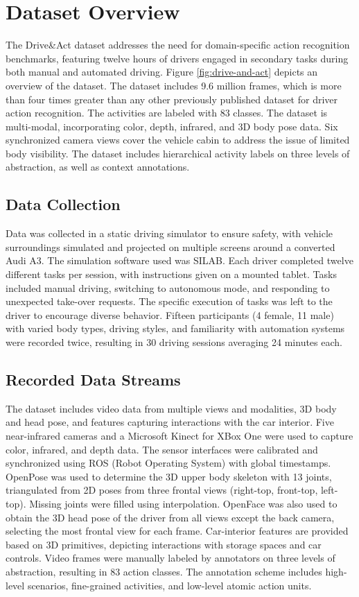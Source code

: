 \documentclass{article}
\begin{document}
\section{Dataset Overview}

The Drive\&Act dataset \cite{drive_and_act_2019_iccv} addresses the need for domain-specific action recognition benchmarks, featuring twelve hours of drivers engaged in secondary tasks during both manual and automated driving. Figure \ref{fig:drive-and-act} depicts an overview of the dataset. The dataset includes 9.6 million frames, which is more than four times greater than any other previously published dataset for driver action recognition. The activities are labeled with 83 classes. The dataset is multi-modal, incorporating color, depth, infrared, and 3D body pose data. Six synchronized camera views cover the vehicle cabin to address the issue of limited body visibility. The dataset includes hierarchical activity labels on three levels of abstraction, as well as context annotations.
\subsection{Data Collection}
Data was collected in a static driving simulator to ensure safety, with vehicle surroundings simulated and projected on multiple screens around a converted Audi A3. The simulation software used was SILAB.
Each driver completed twelve different tasks per session, with instructions given on a mounted tablet. Tasks included manual driving, switching to autonomous mode, and responding to unexpected take-over requests. The specific execution of tasks was left to the driver to encourage diverse behavior.
Fifteen participants (4 female, 11 male) with varied body types, driving styles, and familiarity with automation systems were recorded twice, resulting in 30 driving sessions averaging 24 minutes each.
\subsection{Recorded Data Streams}
The dataset includes video data from multiple views and modalities, 3D body and head pose, and features capturing interactions with the car interior. Five near-infrared cameras and a Microsoft Kinect for XBox One were used to capture color, infrared, and depth data. The sensor interfaces were calibrated and synchronized using ROS (Robot Operating System) with global timestamps.
OpenPose was used to determine the 3D upper body skeleton with 13 joints, triangulated from 2D poses from three frontal views (right-top, front-top, left-top). Missing joints were filled using interpolation. OpenFace was also used to obtain the 3D head pose of the driver from all views except the back camera, selecting the most frontal view for each frame. Car-interior features are provided based on 3D primitives, depicting interactions with storage spaces and car controls. Video frames were manually labeled by annotators on three levels of abstraction, resulting in 83 action classes. The annotation scheme includes high-level scenarios, fine-grained activities, and low-level atomic action units.
\end{document}
